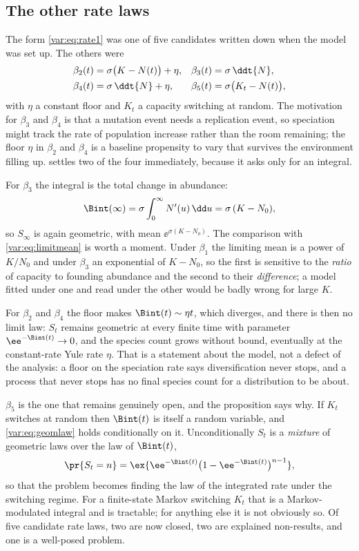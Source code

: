 \subsection{The other rate laws}
\label{var:sec:altrates}

The form \cref{var:eq:rate1} was one of five candidates written down when the
model was set up. The others were
\begin{align}
\beta_2(t)&=\sigma\bigl(K-N(t)\bigr)+\eta, &
\beta_3(t)&=\sigma\,\ddt{N}, \notag\\
\beta_4(t)&=\sigma\,\ddt{N}+\eta, &
\beta_5(t)&=\sigma\bigl(K_t-N(t)\bigr),
\label{var:eq:altrates}
\end{align}
with $\eta$ a constant floor and $K_t$ a capacity switching at random. The
motivation for $\beta_3$ and $\beta_4$ is that a mutation event needs a
replication event, so speciation might track the rate of population increase
rather than the room remaining; the floor $\eta$ in $\beta_2$ and $\beta_4$
is a baseline propensity to vary that survives the environment filling up.
 settles two of the four immediately, because it
asks only for an integral.

For $\beta_3$ the integral is the total change in abundance:
\begin{equation}
\Bint(\infty)=\sigma\int_0^\infty N'(u)\,\dd u=\sigma\,(K-N_0),
\label{var:eq:beta3}
\end{equation}
so $S_\infty$ is again geometric, with mean $\ee^{\sigma(K-N_0)}$. The
comparison with \cref{var:eq:limitmean} is worth a moment. Under $\beta_1$
the limiting mean is a power of $K/N_0$ and under $\beta_3$ an exponential of
$K-N_0$, so the first is sensitive to the \emph{ratio} of capacity to
founding abundance and the second to their \emph{difference}; a model fitted
under one and read under the other would be badly wrong for large $K$.

For $\beta_2$ and $\beta_4$ the floor makes $\Bint(t)\sim\eta t$, which
diverges, and there is then no limit law: $S_t$ remains geometric at every
finite time with parameter $\ee^{-\Bint(t)}\to0$, and the species count grows
without bound, eventually at the constant-rate Yule rate $\eta$. That is a
statement about the model, not a defect of the analysis: a floor on the
speciation rate says diversification never stops, and a process that never
stops has no final species count for a distribution to be about.

$\beta_5$ is the one that remains genuinely open, and the proposition says
why. If $K_t$ switches at random then $\Bint(t)$ is itself a random variable,
and \cref{var:eq:geomlaw} holds conditionally on it. Unconditionally $S_t$ is
a \emph{mixture} of geometric laws over the law of $\Bint(t)$,
\begin{equation}
\pr{S_t=n}=\ex{\ee^{-\Bint(t)}\bigl(1-\ee^{-\Bint(t)}\bigr)^{n-1}},
\label{var:eq:mixture}
\end{equation}
so that the problem becomes finding the law of the integrated rate under the
switching regime. For a finite-state Markov switching $K_t$ that is a
Markov-modulated integral and is tractable; for anything else it is not
obviously so. Of five candidate rate laws, two are now closed, two are
explained non-results, and one is a well-posed problem.

